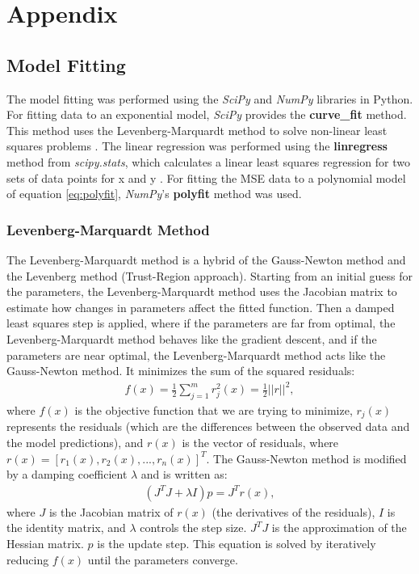 \chapter{Appendix}\label{chap:appendix}
\section{Model Fitting}\label{sec:modelfitting}
The model fitting was performed using the \textit{SciPy} and \textit{NumPy} libraries in Python. For fitting data to an exponential model, \textit{SciPy} provides the \textbf{curve\_fit} method. This method uses the Levenberg-Marquardt method to solve non-linear least squares problems \cite{SciPyCurveFit}. The linear regression was performed using the \textbf{linregress} method from \textit{scipy.stats}, which calculates a linear least squares regression for two sets of data points for x and y \cite{SciPyLinRegress}. For fitting the MSE data to a polynomial model of equation \ref{eq:polyfit}, \textit{NumPy}'s \textbf{polyfit} method was used. 

\subsection{Levenberg-Marquardt Method}\label{subsec:lmMethod}
The Levenberg-Marquardt method is a hybrid of the Gauss-Newton method and the Levenberg method (Trust-Region approach). Starting from an initial guess for the parameters, the Levenberg-Marquardt method uses the Jacobian matrix to estimate how changes in parameters affect the fitted function. Then a damped least squares step is applied, where if the parameters are far from optimal, the Levenberg-Marquardt method behaves like the gradient descent, and if the parameters are near optimal, the Levenberg-Marquardt method acts like the Gauss-Newton method. It minimizes the sum of the squared residuals:
\begin{align}
    f(x)=\frac{1}{2}\sum_{j=1}^{m}{r_{j}^{2}(x)=\frac{1}{2}||r||^{2}},
\end{align}
where $f(x)$ is the objective function that we are trying to minimize, $r_{j}(x)$ represents the residuals (which are the differences between the observed data and the model predictions), and $r(x)$ is the vector of residuals, where $r(x)=[r_{1}(x), r_{2}(x),...,r_{n}(x)]^T$. The Gauss-Newton method is modified by a damping coefficient $\lambda$ and is written as:
\begin{align}
    (J^{T}J+ \lambda I)p = J^{T}r(x),
\end{align}
where $J$ is the Jacobian matrix of $r(x)$ (the derivatives of the residuals), $I$ is the identity matrix, and $\lambda$ controls the step size. $J^{T}J$ is the approximation of the Hessian matrix. $p$ is the update step. This equation is solved by iteratively reducing $f(x)$ until the parameters converge.

